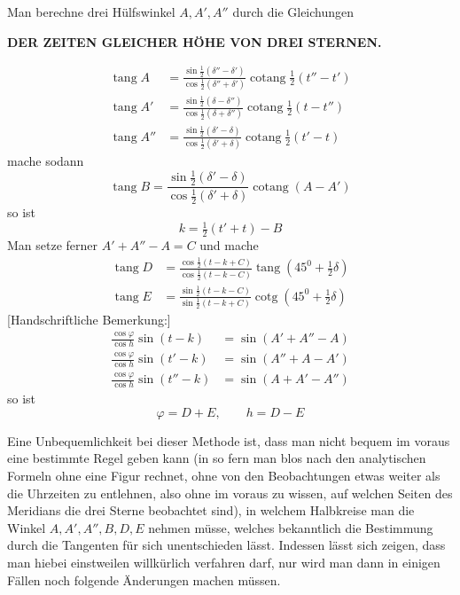 Man berechne drei Hülfswinkel $A,A',A''$ durch die Gleichungen
\par\clearpage
\thispagestyle{empty}
\noindent{}%
\makebox[12mm][l]{}%
\parbox[t]{\dimexpr\linewidth-24mm\relax}{\centering\footnotesize\bfseries DER ZEITEN GLEICHER HÖHE VON DREI STERNEN.\par}%
\par\nobreak\medskip
\fontsize{10.5}{11.75}\selectfont
\setlength{\abovedisplayskip}{7pt plus 2pt minus 2pt}
\setlength{\belowdisplayskip}{7pt plus 2pt minus 2pt}
\setlength{\abovedisplayshortskip}{4pt plus 2pt}
\setlength{\belowdisplayshortskip}{5pt plus 2pt minus 1pt}
\renewcommand{\footnoterule}{\kern-3pt\hrule width .225\columnwidth\kern2.6pt}
\[
\begin{aligned}
\operatorname{tang}A&=\frac{\sin\frac12(\delta''-\delta')}{\cos\frac12(\delta''+\delta')}\operatorname{cotang}\tfrac12(t''-t')\\
\operatorname{tang}A'&=\frac{\sin\frac12(\delta-\delta'')}{\cos\frac12(\delta+\delta'')}\operatorname{cotang}\tfrac12(t-t'')\\
\operatorname{tang}A''&=\frac{\sin\frac12(\delta'-\delta)}{\cos\frac12(\delta'+\delta)}\operatorname{cotang}\tfrac12(t'-t)
\end{aligned}
\]
mache sodann
\[
\operatorname{tang}B=\frac{\sin\frac12(\delta'-\delta)}{\cos\frac12(\delta'+\delta)}\operatorname{cotang}(A-A')
\]
so ist
\[
k=\tfrac12(t'+t)-B
\]
Man setze ferner $A'+A''-A=C$ und mache
\[
\begin{aligned}
\operatorname{tang}D&=\frac{\cos\frac12(t-k+C)}{\cos\frac12(t-k-C)}\operatorname{tang}(45^0+\tfrac12\delta)\\
\operatorname{tang}E&=\frac{\sin\frac12(t-k-C)}{\sin\frac12(t-k+C)}\operatorname{cotg}(45^0+\tfrac12\delta)
\end{aligned}
\]
\expandafter\gdef\csname HistoricalNoteText6\endcsname{{[Handschriftliche Bemerkung:]}
\[
\begin{aligned}
\frac{\cos\varphi}{\cos h}\sin(t-k)&=\sin(A'+A''-A)\\
\frac{\cos\varphi}{\cos h}\sin(t'-k)&=\sin(A''+A-A')\\
\frac{\cos\varphi}{\cos h}\sin(t''-k)&=\sin(A+A'-A'')
\end{aligned}
\]}
so ist
\[
\varphi=D+E,\qquad h=D-E
\]

Eine Unbequemlichkeit bei dieser Methode ist, dass man nicht bequem im voraus eine bestimmte Regel geben kann (in so fern man blos nach den analytischen Formeln ohne eine Figur rechnet, ohne von den Beobachtungen etwas weiter als die Uhrzeiten zu entlehnen, also ohne im voraus zu wissen, auf welchen Seiten des Meridians die drei Sterne beobachtet sind), in welchem Halbkreise man die Winkel $A,A',A'',B,D,E$ nehmen müsse, welches bekanntlich die Bestimmung durch die Tangenten für sich unentschieden lässt. Indessen lässt sich zeigen, dass man hiebei einstweilen willkürlich verfahren darf, nur wird man dann in einigen Fällen noch folgende Änderungen machen müssen.

